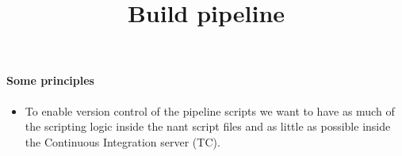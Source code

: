 \documentclass{article}
\begin{document}
\title{Build pipeline}

\maketitle

\paragraph{Some principles}

\begin{itemize}
\item To enable version control of the pipeline scripts we want to
  have as much of the scripting logic inside the nant script files and
  as little as possible inside the Continuous Integration server (TC).
\end{itemize}
\end{document}
